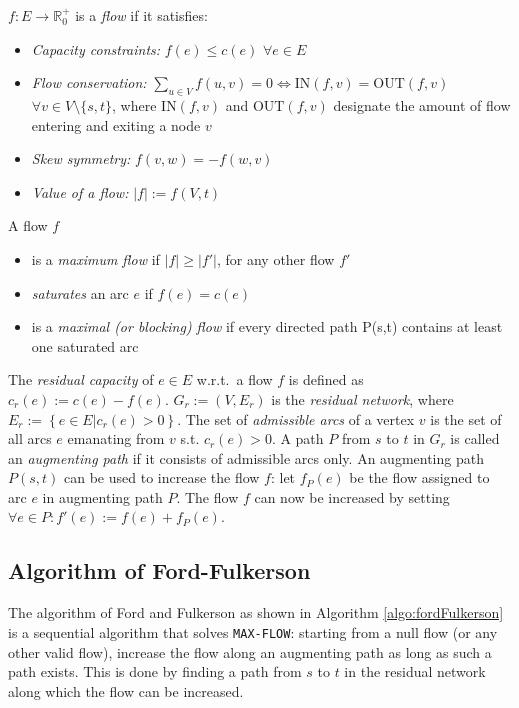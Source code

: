 \documentclass[a4paper,10pt, twocolumn]{article}
\begin{document}
\medskip
$f:E \rightarrow \mathbb{R}_0^{+}$ is a \textit{flow} if it satisfies:
\begin{itemize}
	\item \emph{Capacity constraints:} $f(e) \leq c(e)$ $\forall e \in E$
	\item \emph{Flow conservation:} 
	$ \sum\limits_{u \in V} f(u,v) =  0 \Leftrightarrow \mathrm{IN}(f,v) = \mathrm{OUT}(f,v)$ $\forall v \in V \setminus \{s,t\}$, where $\mathrm{IN}(f,v)$ and $\mathrm{OUT}(f,v)$ designate the amount of flow entering and exiting a node $v$
	\item \emph{Skew symmetry:} $f(v,w) = -f(w,v)$
	\item \emph{Value of a flow:} $\lvert f\rvert := f(V,t)$ 
\end{itemize}

A flow $f$
\begin{itemize}
	\item is a \emph{maximum flow} if $\lvert f\rvert \geq \lvert f'\rvert$, for any other flow $f'$
	\item \emph{saturates} an arc $e$ if $f(e) = c(e)$
	\item is a \emph{maximal (or blocking) flow} if every directed path P(s,t) contains at least one saturated arc
\end{itemize}
\medskip
The \emph{residual capacity} of $e \in E$ w.r.t.\ a flow $f$ is defined as $c_r(e) := c(e) - f(e)$. $G_r := (V, E_r)$ is the \emph{residual network}, where $E_r := \left\{e \in E \lvert c_r(e) > 0\right\}$. The set of \emph{admissible arcs} of a vertex $v$ is the set of all arcs $e$ emanating from $v$ s.t. $c_r(e) > 0$.  A path $P$ from $s$ to $t$ in $G_r$ is called an \emph{augmenting path} if it consists of admissible arcs only. An augmenting path $P(s,t)$ can be used to increase the flow $f$: let $f_P(e)$ be the flow assigned to arc $e$ in augmenting path $P$. The flow $f$ can now be increased by setting $\forall e \in P: f'(e) := f(e) + f_P(e)$.

\subsection{Algorithm of Ford-Fulkerson}
\label{sec:fordfulkerson}
The algorithm of Ford and Fulkerson as shown in Algorithm \ref{algo:fordFulkerson} is a sequential algorithm that solves \lstinline|MAX-FLOW|: starting from a null flow (or any other valid flow), increase the flow along an augmenting path as long as such a path exists. This is done by finding a path from $s$ to $t$ in the residual network along which the flow can be increased. 
\end{document}
